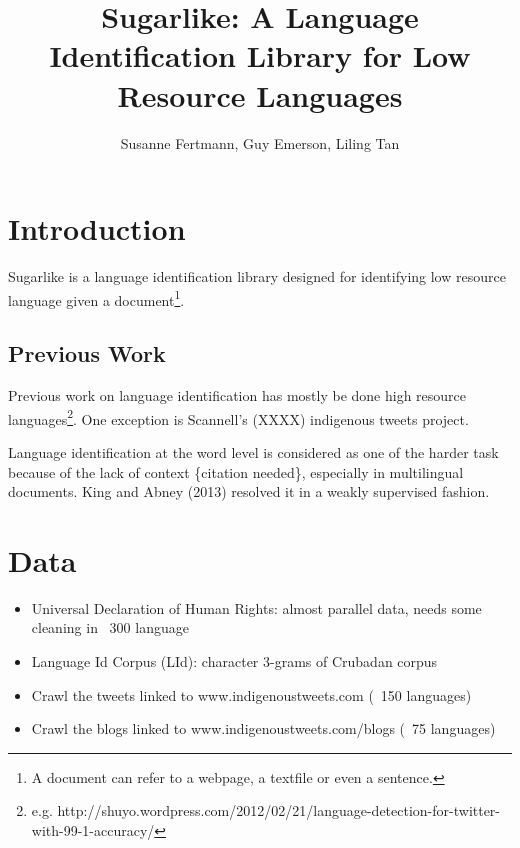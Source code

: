 \documentclass[11pt]{article}
\title{\textbf{Sugarlike: A Language Identification Library for Low Resource Languages}}
\author{Susanne Fertmann, Guy Emerson, Liling Tan}
\date{}
\begin{document}
\maketitle

\section{Introduction}

Sugarlike is a language identification library designed for identifying low resource language given a document\footnote{A document can refer to a webpage, a textfile or even a sentence.}.


\subsection{Previous Work}

Previous work on language identification has mostly be done high resource languages\footnote{e.g. http://shuyo.wordpress.com/2012/02/21/language-detection-for-twitter-with-99-1-accuracy/}. One exception is Scannell's (XXXX) indigenous tweets project. %

Language identification at the word level is considered as one of the harder task because of the lack of context \{citation needed\}, especially in multilingual documents. King and Abney (2013) resolved it in a weakly supervised fashion.


\section{Data}


\begin{itemize}
\item Universal Declaration of Human Rights: almost parallel data,  needs some cleaning in ~300 language
\item Language Id Corpus (LId): character 3-grams of Crubadan corpus %
\item Crawl the tweets linked to www.indigenoustweets.com (~150 languages)
\item Crawl the blogs linked to www.indigenoustweets.com/blogs (~75 languages)
\end{itemize}
\end{document}
